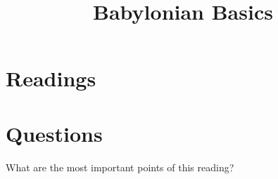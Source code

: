 \documentclass{ximera}
\title{Babylonian Basics}
\begin{document}
\begin{abstract}
\end{abstract}
\maketitle






\section{Readings}








\section{Questions}




\begin{question}
What are the most important points of this reading?
\begin{freeResponse}
\end{freeResponse}
\end{question}
\end{document}
